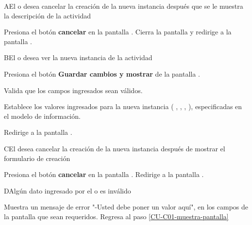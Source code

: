 \begin{UCtrayectoriaA}%
  {A}{El  o  desea cancelar la creación de la nueva instancia después que se le muestra la descripción de la actividad}

  \Actor Presiona el botón {\bf cancelar} en la pantalla .
  \Sistema Cierra la pantalla  y redirige a la pantalla .

\end{UCtrayectoriaA}

\begin{UCtrayectoriaA}{B}{El  o  desea ver la nueva instancia de la actividad}

    \Actor Presiona el botón {\bf Guardar cambios y mostrar} de la pantalla .

    \Sistema Valida que los campos ingresados sean válidos.  

    \Sistema Establece los valores ingresados para la nueva instancia  (
      ,
      ,
      ,
      ), especificadas en el modelo de información.

    \Sistema Redirige a la pantalla .

\end{UCtrayectoriaA}

\begin{UCtrayectoriaA}%
  {C}{El  desea cancelar la creación de la nueva instancia después de mostrar el formulario de creación}

  \Actor Presiona el botón {\bf cancelar} en la pantalla .
  \Sistema Redirige a la pantalla .

\end{UCtrayectoriaA}

\begin{UCtrayectoriaA}{D}{Algún dato ingresado por el  o  es inválido}

  \Sistema Muestra un mensaje de error "-Usted debe poner un valor aquí", en los campos de la pantalla  que sean requeridos.
  \Sistema Regresa al paso \ref{CU-C01-muestra-pantalla}

\end{UCtrayectoriaA}
